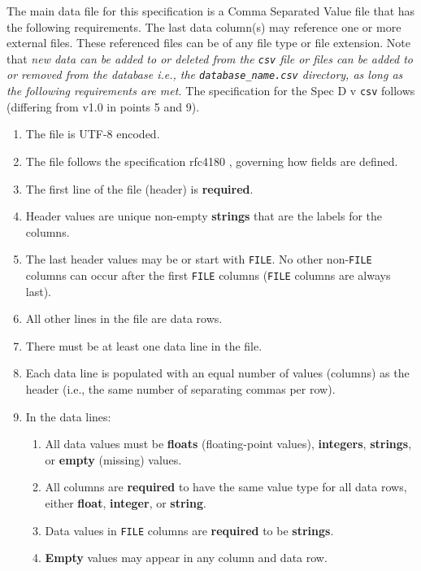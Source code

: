 The main data file for this specification is a Comma Separated Value file that
has the following requirements.  The last data column(s) may reference one or
more external files. These referenced files can be of any file type or file
extension.  Note that \textit{new data can be added to or deleted from the
\texttt{\small csv} file or files can be added to or removed from the database
i.e., the \texttt{\small database\_name.csv} directory, as long as the 
following requirements are met.} The specification for the Spec D v\version
\texttt{\small csv} follows (differing from v1.0 in points 5 and 9).

\begin{enumerate}
\item The file is UTF-8 encoded.
\item The file follows the specification rfc4180 \cite{rfc4180}, governing how
fields are defined.
\item The first line of the file (header) is \textbf{required}.  
\item Header values are unique non-empty \textbf{strings} that are the labels 
for the columns.
\item The last header values may be or start with \texttt{\small FILE}. No 
other non-\texttt{\small FILE} columns can occur after the first
\texttt{\small FILE} columns (\texttt{\small FILE} columns are always last). 
\item All other lines in the file are data rows.
\item There must be at least one data line in the file.
\item Each data line is populated with an equal number of values
(columns) as the header (i.e., the same number of separating commas per row).
\item In the data lines:
\begin{enumerate}
\item All data values must be \textbf{floats} (floating-point values), 
\textbf{integers}, \textbf{strings}, or \textbf{empty} (missing) values.
\item All columns are \textbf{required} to have the same value type for
all data rows, either \textbf{float}, \textbf{integer}, or \textbf{string}.
\item Data values in \texttt{\small FILE} columns are \textbf{required}
to be \textbf{strings}.
\item \textbf{Empty} values may appear in any column and data row.

\end{enumerate}
\end{enumerate}
